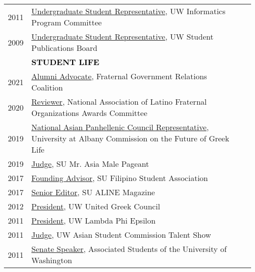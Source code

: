 \documentclass[11pt]{article}
\begin{document}
{{\begin{longtable}{Rp{0.75in}p{5.0in}}
\footnotesize{2011} & \href{https://ischool.uw.edu/about/leadership}{{Undergraduate Student Representative}}, UW Informatics Program Committee\\

\footnotesize{2009} & \href{https://en.wikipedia.org/wiki/The_Daily_of_the_University_of_Washington}{{Undergraduate Student Representative}}, UW Student Publications Board\\

& \textcolor{black}{\uppercase{\textbf{Student Life}}}\\
\footnotesize{2021} & 
 \href{http://www.fgrc.com/}{{Alumni Advocate}}, Fraternal Government Relations Coalition\\

\footnotesize{2020} & 
 \href{https://nalfo.org/nalfo-awards/}{{Reviewer}}, National Association of Latino Fraternal Organizations Awards Committee\\

\footnotesize{2019} & 
 \href{https://www.albany.edu/studentaffairs/commission_members.shtml}{{National Asian Panhellenic Council Representative}}, University at Albany Commission on the Future of Greek Life\\

\footnotesize{2019} & 
 \href{http://multicultural.syr.edu/events/asian-pacific.html}{{Judge}}, SU Mr. Asia Male Pageant\\

\footnotesize{2017} & 
 \href{https://www.facebook.com/syracusefsa/}{{Founding Advisor}}, SU Filipino Student Association\\

\footnotesize{2017} & \href{https://issuu.com/alinemagazine}{{Senior Editor}}, SU ALINE Magazine\\

\footnotesize{2012} & \href{https://www.dailyuw.com/news/article_3c781595-0b4d-52be-9a6e-b2c956ae72eb.html}{{President}}, UW United Greek Council\\

\footnotesize{2011} & \href{https://uwlambdas.com/}{{President}}, UW Lambda Phi Epsilon\\

\footnotesize{2011} & \href{https://www.facebook.com/events/972221256174460/}{{Judge}}, UW Asian Student Commission Talent Show\\

\footnotesize{2011} & \href{http://www.dailyuw.com/news/article_da48b049-d2a0-582c-9dfb-4589755ff1e5.html}{{Senate Speaker}}, Associated Students of the University of Washington\\


\end{longtable}}}
\end{document}
